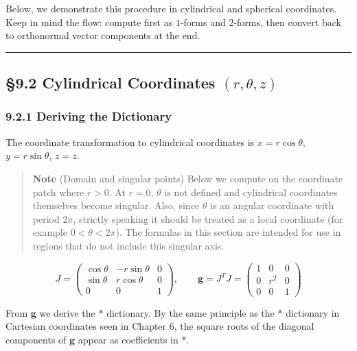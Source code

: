 Below, we demonstrate this procedure in cylindrical and spherical
coordinates. Keep in mind the flow: compute first as \(1\)-forms and
\(2\)-forms, then convert back to orthonormal vector components at the
end.

\begin{center}\rule{0.5\linewidth}{0.5pt}\end{center}

\hypertarget{cylindrical-coordinates-rthetaz}{%
\subsection{\texorpdfstring{§9.2 Cylindrical Coordinates
\((r,\theta,z)\)}{§9.2 Cylindrical Coordinates (r,\textbackslash theta,z)}}\label{cylindrical-coordinates-rthetaz}}

\hypertarget{deriving-the-dictionary}{%
\subsubsection{9.2.1 Deriving the
Dictionary}\label{deriving-the-dictionary}}

The coordinate transformation to cylindrical coordinates is
\(x = r\cos\theta\), \(y = r\sin\theta\), \(z = z\).

\begin{quote}
\textbf{Note} (Domain and singular points) Below we compute on the
coordinate patch where \(r > 0\). At \(r = 0\), \(\theta\) is not
defined and cylindrical coordinates themselves become singular. Also,
since \(\theta\) is an angular coordinate with period \(2\pi\), strictly
speaking it should be treated as a local coordinate (for example
\(0 < \theta < 2\pi\)). The formulas in this section are intended for
use in regions that do not include this singular axis.
\end{quote}

\[J = \begin{pmatrix}
\cos\theta & -r\sin\theta & 0 \\
\sin\theta & r\cos\theta & 0 \\
0 & 0 & 1
\end{pmatrix}, \qquad
\mathbf{g} = J^T J = \begin{pmatrix}
1 & 0 & 0 \\
0 & r^2 & 0 \\
0 & 0 & 1
\end{pmatrix}\]

From \(\mathbf{g}\) we derive the \(\ast\) dictionary. By the same
principle as the \(\ast\) dictionary in Cartesian coordinates seen in
Chapter 6, the square roots of the diagonal components of \(\mathbf{g}\)
appear as coefficients in \(\ast\).

